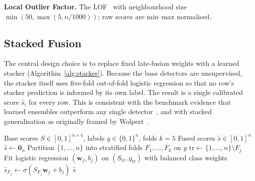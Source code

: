 \documentclass{ieeeaccess}
\begin{document}
\textbf{Local Outlier Factor.} The LOF~\cite{breunig2000lof} with neighbourhood
size $\min(50, \max(5, n/1000))$; raw scores are min--max normalised.

\subsection{Stacked Fusion}

The central design choice is to replace fixed late-fusion weights with a learned
stacker (Algorithm~\ref{alg:stacker}). Because the base detectors are
unsupervised, the stacker itself uses five-fold out-of-fold logistic regression
so that no row's stacker prediction is informed by its own label. The result is a
single calibrated score $\hat{s}_i$ for every row. This is consistent with the
benchmark evidence that learned ensembles outperform any single
detector~\cite{han2022adbench, sagi2018ensemble}, and with stacked
generalisation as originally framed by Wolpert~\cite{wolpert1992stacked}.

\begin{algorithm}[tbp]
\caption{Stacked Hybrid Anomaly Score}
\label{alg:stacker}
\begin{algorithmic}[1]
\Require Base scores $S \in [0,1]^{n\times 4}$, labels $y \in \{0,1\}^n$,
  folds $k = 5$
\Ensure Fused scores $\hat{s} \in [0,1]^n$
\State $\hat{s} \gets \mathbf{0}_n$
\State Partition $\{1,\dots,n\}$ into stratified folds $F_1,\dots,F_k$ on $y$
  \State $\mathrm{tr} \gets \{1,\dots,n\} \setminus F_j$
  \State Fit logistic regression $(\mathbf{w}_j, b_j)$ on
    $(S_{\mathrm{tr}}, y_{\mathrm{tr}})$ with balanced class weights
  \State $\hat{s}_{F_j} \gets \sigma(S_{F_j}\mathbf{w}_j + b_j)$
\EndFor
\State \Return $\hat{s}$
\end{algorithmic}
\end{algorithm}
\end{document}
